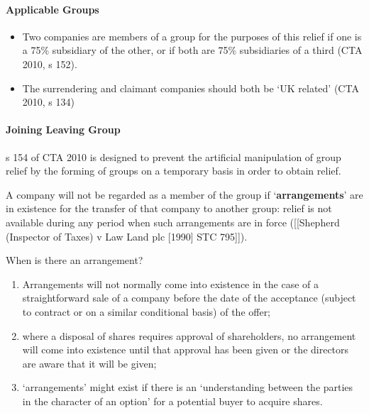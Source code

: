 \documentclass[
]{article}
\newenvironment{Shaded}{}{}
\newcommand{\NormalTok}[1]{#1}
\providecommand{\tightlist}{%
  \setlength{\itemsep}{0pt}\setlength{\parskip}{0pt}}
\begin{document}
\hypertarget{applicable-groups}{%
\paragraph{Applicable Groups}\label{applicable-groups}}

\begin{itemize}
\tightlist
\item
  Two companies are members of a group for the purposes of this relief
  if one is a 75\% subsidiary of the other, or if both are 75\%
  subsidiaries of a third (CTA 2010, s 152).
\item
  The surrendering and claimant companies should both be `UK related'
  (CTA 2010, s 134)
\end{itemize}

\hypertarget{joining-leaving-group}{%
\paragraph{Joining Leaving Group}\label{joining-leaving-group}}

s 154 of CTA 2010 is designed to prevent the artificial manipulation of
group relief by the forming of groups on a temporary basis in order to
obtain relief.

A company will not be regarded as a member of the group if
`\textbf{arrangements}' are in existence for the transfer of that
company to another group: relief is not available during any period when
such arrangements are in force ({[}{[}Shepherd (Inspector of Taxes) v
Law Land plc {[}1990{]} STC 795{]}{]}).

\begin{Shaded}
\begin{Highlighting}[]
\NormalTok{When is there an arrangement?}
\end{Highlighting}
\end{Shaded}

\begin{enumerate}
\def\labelenumi{\arabic{enumi}.}
\tightlist
\item
  Arrangements will not normally come into existence in the case of a
  straightforward sale of a company before the date of the acceptance
  (subject to contract or on a similar conditional basis) of the offer;
\item
  where a disposal of shares requires approval of shareholders, no
  arrangement will come into existence until that approval has been
  given or the directors are aware that it will be given;
\item
  `arrangements' might exist if there is an `understanding between the
  parties in the character of an option' for a potential buyer to
  acquire shares.
\end{enumerate}
\end{document}
